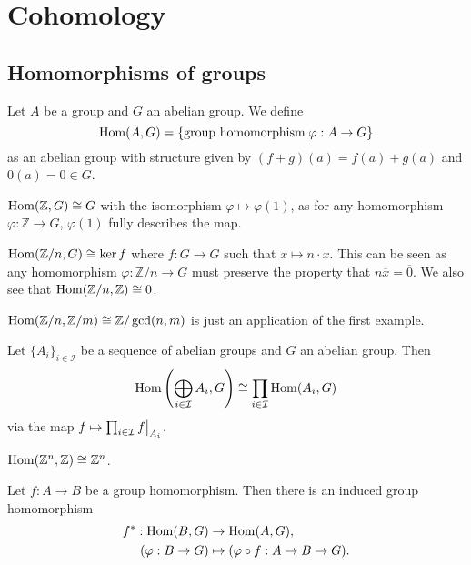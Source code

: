 \section{Cohomology}

\subsection{Homomorphisms of groups}

\begin{definition}
    Let $A$ be a group and $G$ an abelian group. We define
    \[ \operatorname{Hom}(A, G) = \{\text{group homomorphism}\;\varphi: A \to G\} \]
    as an abelian group with structure given by $(f + g)(a) = f(a) + g(a)$ and $0(a) = 0 \in G$.
\end{definition}

\begin{example}
    $\operatorname{Hom}(\mathbb Z, G) \cong G$ with the isomorphism $\varphi \mapsto \varphi(1)$, as for any homomorphism $\varphi: \mathbb Z \to G$, $\varphi(1)$ fully describes the map.
\end{example}

\begin{example}
    $\operatorname{Hom}(\mathbb Z/n, G) \cong \ker f$ where $f: G \to G$ such that $x \mapsto n \cdot x$. This can be seen as any homomorphism $\varphi: \mathbb Z/n \to G$ must preserve the property that $n\overline x = \overline 0$. We also see that $\operatorname{Hom}(\mathbb Z/n, \mathbb Z) \cong 0$.
\end{example}

\begin{example}
    $\operatorname{Hom}(\mathbb Z/n, \mathbb Z/m) \cong \mathbb Z/\gcd(n, m)$ is just an application of the first example.
\end{example}

\begin{lemma}
    Let $\{A_i\}_{i\in \mathcal I}$ be a sequence of abelian groups and $G$ an abelian group. Then
    \[
        \operatorname{Hom}\left(
        \bigoplus_{i \in \mathcal I} A_i, G
        \right) \cong \prod_{i \in \mathcal I} \operatorname{Hom}(A_i, G)
    \]
    via the map $f \mapsto \prod_{i \in \mathcal I} \restr f{A_i}$.
\end{lemma}

\begin{corollary}
    $\operatorname{Hom}(\mathbb Z^n, \mathbb Z) \cong \mathbb Z^n$.
\end{corollary}

Let $f: A \to B$ be a group homomorphism. Then there is an induced group homomorphism
\begin{align*}
    f^*: \operatorname{Hom}(B,G)     & \to \operatorname{Hom}(A, G),                           \\
    (\varphi: B \to G) & \mapsto (\varphi \circ f: A \to B \to G).
\end{align*}

